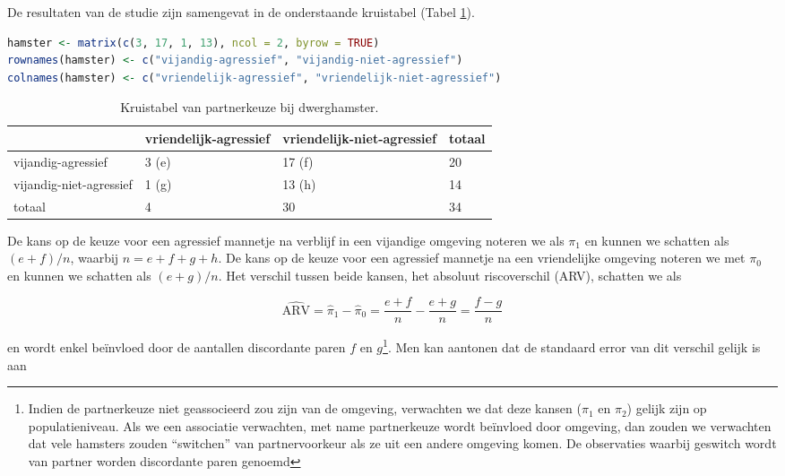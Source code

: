 \documentclass[
  12pt,dutch,coursenotes]{book}
\begin{document}
De resultaten van de studie zijn samengevat in de onderstaande kruistabel (Tabel \ref{tab:catHamster}).

\begin{lstlisting}[language=R]
hamster <- matrix(c(3, 17, 1, 13), ncol = 2, byrow = TRUE)
rownames(hamster) <- c("vijandig-agressief", "vijandig-niet-agressief")
colnames(hamster) <- c("vriendelijk-agressief", "vriendelijk-niet-agressief")
\end{lstlisting}

\begin{table}

\caption{\label{tab:catHamster}Kruistabel van partnerkeuze bij dwerghamster.}
\centering
\begin{tabular}[t]{llll}
\toprule
  & vriendelijk-agressief & vriendelijk-niet-agressief & totaal\\
\midrule
vijandig-agressief & 3 (e) & 17 (f) & 20\\
vijandig-niet-agressief & 1 (g) & 13 (h) & 14\\
totaal & 4 & 30 & 34\\
\bottomrule
\end{tabular}
\end{table}

De kans op de keuze voor een agressief mannetje na verblijf in een vijandige omgeving noteren we als \(\pi_1\) en kunnen we schatten als \((e+f)/n\), waarbij \(n=e+f+g+h\). De kans op
de keuze voor een agressief mannetje na een vriendelijke omgeving noteren we met \(\pi_0\)
en kunnen we schatten als \((e+g)/n\). Het verschil tussen beide kansen,
het absoluut riscoverschil (ARV), schatten we als

\begin{equation*}
\widehat{\text{ARV}}=\hat\pi_1-\hat\pi_0=\frac{e+f}{n}-\frac{e+g}{n}=\frac{f-g}{n}
\end{equation*}

en wordt enkel beïnvloed door de aantallen discordante paren \(f\) en \(g\)\footnote{Indien de partnerkeuze niet geassocieerd zou zijn van de omgeving, verwachten we dat deze kansen (\(\pi_1\) en \(\pi_2\)) gelijk zijn op populatieniveau. Als we een associatie verwachten, met name partnerkeuze wordt beïnvloed door omgeving, dan zouden we verwachten dat vele hamsters zouden ``switchen'' van partnervoorkeur als ze uit een andere omgeving komen. De observaties waarbij geswitch wordt van partner worden discordante paren genoemd}. Men kan aantonen dat de standaard error van dit verschil gelijk is aan
\end{document}
